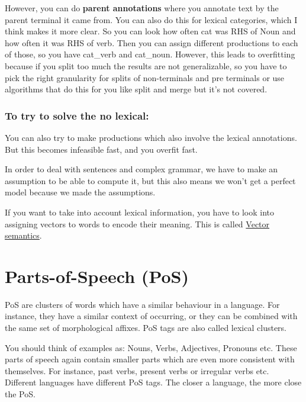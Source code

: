 \documentclass[
  11pt,
  british,
]{article}
\begin{document}
However, you can do \textbf{parent annotations} where you annotate text
by the parent terminal it came from. You can also do this for lexical
categories, which I think makes it more clear. So you can look how often
cat was RHS of Noun and how often it was RHS of verb. Then you can
assign different productions to each of those, so you have cat\_verb and
cat\_noun. However, this leads to overfitting because if you split too
much the results are not generalizable, so you have to pick the right
granularity for splits of non-terminals and pre terminals or use
algorithms that do this for you like split and merge but it's not
covered.

\hypertarget{to-try-to-solve-the-no-lexical}{%
\subsubsection{To try to solve the no
lexical:}\label{to-try-to-solve-the-no-lexical}}

You can also try to make productions which also involve the lexical
annotations. But this becomes infeasible fast, and you overfit fast.

In order to deal with sentences and complex grammar, we have to make an
assumption to be able to compute it, but this also means we won't get a
perfect model because we made the assumptions.

If you want to take into account lexical information, you have to look
into assigning vectors to words to encode their meaning. This is called
\href{../Semantic-Similarity/Vector\%20semantics.md}{Vector semantics}.

\hypertarget{parts-of-speech-pos}{%
\section{Parts-of-Speech (PoS)}\label{parts-of-speech-pos}}

PoS are clusters of words which have a similar behaviour in a language.
For instance, they have a similar context of occurring, or they can be
combined with the same set of morphological affixes. PoS tags are also
called lexical clusters.

You should think of examples as: Nouns, Verbs, Adjectives, Pronouns etc.
These parts of speech again contain smaller parts which are even more
consistent with themselves. For instance, past verbs, present verbs or
irregular verbs etc. Different languages have different PoS tags. The
closer a language, the more close the PoS.
\end{document}
